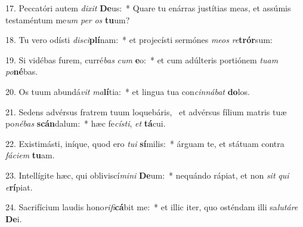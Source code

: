 17. Peccatóri autem \textit{di}\textit{xit} \textbf{De}us:~*  Quare tu enárras justítias meas, et assúmis testaméntum me\textit{um} \textit{per} \textit{os} \textbf{tu}um?\

18. Tu vero odísti \textit{di}\textit{sci}\textbf{plí}nam:~*  et projecísti sermónes \textit{me}\textit{os} \textit{re}\textbf{trór}sum:\

19. Si vidébas furem, curré\textit{bas} \textit{cum} \textbf{e}o:~*  et cum adúlteris portiónem \textit{tu}\textit{am} \textit{po}\textbf{né}bas.\

20. Os tuum abundá\textit{vit} \textit{ma}\textbf{lí}tia:~*  et lingua tua con\textit{cin}\textit{ná}\textit{bat} \textbf{do}los.\

21. Sedens advérsus fratrem tuum loquebáris, \dag\  et advérsus fílium matris tuæ po\textit{né}\textit{bas} \textbf{scán}dalum:~*  hæc fe\textit{cís}\textit{ti}, \textit{et} \textbf{tá}cui.\

22. Existimásti, iníque, quod ero \textit{tu}\textit{i} \textbf{sí}milis:~*  árguam te, et státuam contra \textit{fá}\textit{ci}\textit{em} \textbf{tu}am.\

23. Intellígite hæc, qui obliviscí\textit{mi}\textit{ni} \textbf{De}um:~*  nequándo rápiat, et non \textit{sit} \textit{qui} \textit{e}\textbf{rí}piat.\

24. Sacrifícium laudis hono\textit{ri}\textit{fi}\textbf{cá}bit me:~*  et illic iter, quo osténdam illi sa\textit{lu}\textit{tá}\textit{re} \textbf{De}i.\

